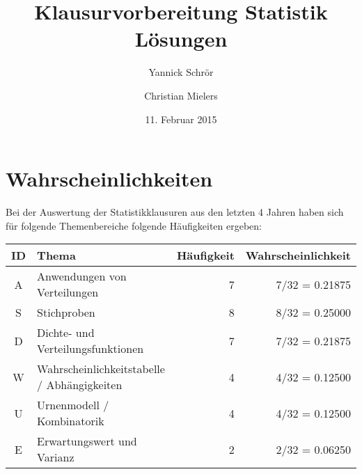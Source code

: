 \documentclass[11pt, a4paper]{article}
\title{Klausurvorbereitung Statistik \\ Lösungen}
\author{Yannick Schrör \and Christian Mielers}
\date{11. Februar 2015}
\begin{document}
\maketitle
\section{Wahrscheinlichkeiten} %
Bei der Auswertung der Statistikklausuren aus den letzten 4 Jahren haben sich für folgende Themenbereiche folgende Häufigkeiten ergeben:\\

\begin{tabular}{c|l|r|r}
	ID 	&	Thema 										& Häufigkeit 	& Wahrscheinlichkeit\\ \hline
	A	& Anwendungen von Verteilungen 					& 7 			& 7/32 = 0.21875\\
	S	& Stichproben 									& 8				& 8/32 = 0.25000\\
	D	& Dichte- und Verteilungsfunktionen 			& 7 			& 7/32 = 0.21875\\
	W	& Wahrscheinlichkeitstabelle / Abhängigkeiten 	& 4 			& 4/32 = 0.12500\\
	U	& Urnenmodell / Kombinatorik 					& 4 			& 4/32 = 0.12500\\
	E	& Erwartungswert und Varianz 					& 2 			& 2/32 = 0.06250\\
\end{tabular}\\
\end{document}
